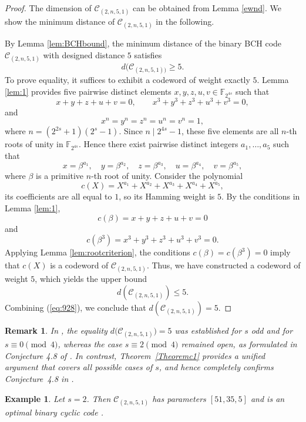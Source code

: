 \documentclass[12pt,draftcls,journal,onecolumn]{IEEEtran}
\newtheorem{remark}[theorem]{Remark}
\newtheorem{example}[theorem]{Example}
\begin{document}
\begin{proof}
The dimension of $\mathcal{C}_{(2,n,5,1)}$ can be obtained from Lemma \ref{ewnd}. We show the minimum distance of $\mathcal{C}_{(2,n,5,1)}$ in the following.

By Lemma \ref{lem:BCHbound}, the minimum distance of the binary BCH code \(\mathcal C_{(2,n,5,1)}\) with designed distance \(5\) satisfies
\begin{equation}\label{eq:928}
d(\mathcal C_{(2,n,5,1))}\ge 5.
\end{equation}
To prove equality, it suffices to exhibit a codeword of weight exactly \(5\).
Lemma \ref{lem:1} provides five pairwise distinct elements
$x,y,z,u,v\in \mathbb F_{2^{4s}}$
such that
\[
x+y+z+u+v=0,\qquad
x^3+y^3+z^3+u^3+v^3=0,
\]
and
\[
x^n=y^n=z^n=u^n=v^n=1,
\]
where \(n=(2^{2s}+1)(2^s-1)\).
Since \(n\mid 2^{4s}-1\), these five elements are all \(n\)-th roots of unity in $\mathbb F_{2^{4s}}$. Hence there exist pairwise distinct integers \(a_1,\dots,a_5\) such that
\[
x=\beta^{a_1},\quad y=\beta^{a_2},\quad z=\beta^{a_3},\quad u=\beta^{a_4},\quad v=\beta^{a_5},
\]
where \(\beta\) is a primitive \(n\)-th root of unity. Consider the polynomial
\[
c(X)=X^{a_1}+X^{a_2}+X^{a_3}+X^{a_4}+X^{a_5},
\]
its coefficients are all equal to \(1\), so its Hamming weight is \(5\).
By the conditions in Lemma \ref{lem:1},
\[
c(\beta)=x+y+z+u+v=0
\]
and
\[
c(\beta^3)=x^3+y^3+z^3+u^3+v^3=0.
\]
Applying Lemma \ref{lem:rootcriterion}, the conditions \(c(\beta)=c(\beta^3)=0\) imply that \(c(X)\) is a codeword of \(\mathcal C_{(2,n,5,1)}\).
Thus, we have constructed a codeword of weight \(5\), which yields the upper bound
\[
d(\mathcal C_{(2,n,5,1)})\le 5.
\]
Combining (\ref{eq:928}), we conclude that
$
d(\mathcal C_{(2,n,5,1)})=5.
$
\end{proof}

\begin{remark}
In \cite{Chen59}, the equality
$
d\bigl(\mathcal{C}_{(2,n,5,1)}\bigr)=5
$
was established for $s$ odd and for $s\equiv 0 \pmod 4$, whereas the case \(s \equiv 2 \pmod{4}\) remained open, as formulated in Conjecture 4.8 of \cite{Chen59}. In contrast, Theorem~\ref{Theoremc1} provides a unified argument that covers all possible cases of $s$, and hence completely confirms Conjecture~4.8 in \cite{Chen59}.
\end{remark}

\begin{example}
Let \( s = 2 \). Then \( \mathcal{C}_{(2,n,5,1)} \) has parameters \([51,35,5]\) and is an optimal binary cyclic code \cite[Appendix A]{DingP1}.
\end{example}
\end{document}
